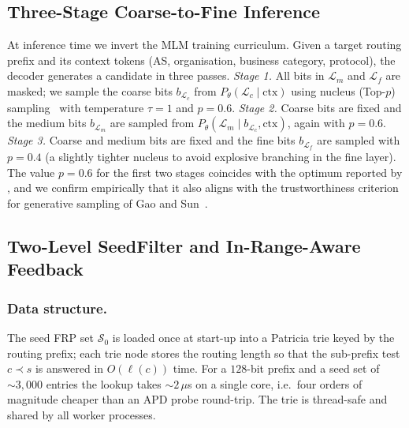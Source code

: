 \documentclass[conference]{IEEEtran}
\begin{document}
\subsection{Three-Stage Coarse-to-Fine Inference}
\label{sec:design:infer}
At inference time we invert the MLM training curriculum.
Given a target routing prefix and its context tokens
(AS, organisation, business category, protocol), the decoder
generates a candidate in three passes.
\emph{Stage 1.}  All bits in $\mathcal{L}_m$ and
$\mathcal{L}_f$ are masked; we sample the coarse bits
$b_{\mathcal{L}_c}$ from
$P_\theta\!\left(\mathcal{L}_c\mid\text{ctx}\right)$ using
nucleus (Top-$p$) sampling~\cite{holtzman2020top-p} with
temperature $\tau\!=\!1$ and $p\!=\!0.6$.
\emph{Stage 2.}  Coarse bits are fixed and the medium bits
$b_{\mathcal{L}_m}$ are sampled from
$P_\theta\!\left(\mathcal{L}_m \mid b_{\mathcal{L}_c},
\text{ctx}\right)$, again with $p\!=\!0.6$.
\emph{Stage 3.}  Coarse and medium bits are fixed and the fine
bits $b_{\mathcal{L}_f}$ are sampled with $p\!=\!0.4$ (a
slightly tighter nucleus to avoid explosive branching in the
fine layer).
The value $p\!=\!0.6$ for the first two stages coincides with
the optimum reported by \cite{wei2025gungnir}, and we confirm
empirically that it also aligns with the trustworthiness
criterion for generative sampling of Gao and
Sun~\cite{gao2024trustworthy}.

\subsection{Two-Level SeedFilter and In-Range-Aware Feedback}
\label{sec:design:feedback}
\subsubsection{Data structure.}
The seed FRP set $\mathcal{S}_{0}$ is loaded once at start-up
into a Patricia trie keyed by the routing prefix; each trie
node stores the routing length so that the sub-prefix test
$c\!\prec\!s$ is answered in $O(\ell(c))$ time.  For a $128$-bit
prefix and a seed set of $\sim\!3{,}000$ entries the lookup takes
$\sim\!2\,\mu$s on a single core, i.e.\ four orders of magnitude
cheaper than an APD probe round-trip.  The trie is thread-safe
and shared by all worker processes.
\end{document}
